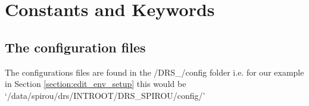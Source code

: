 \chapter{Constants and Keywords}

\newcommand{\calloc}{cal\_loc\_RAW\_spirou.py}
\newcommand{\caldark}{cal\_DARK\_spirou.py}
\newcommand{\calslit}{cal\_SLIT\_spirou.py}
\newcommand{\calff}{cal\_ff\_RAW\_spirou.py}
\newcommand{\calext}{cal\_extract\_RAW\_spirou\definevariable{fiber}.py}
\newcommand{\calextall}{cal\_extract\_RAW\_spirouALL.py}
\newcommand{\caldrift}{cal\_DRIFT\_RAW\_spirou.py}

\newcommand{\spirouRV}{spirouRV.py}
\newcommand{\hadmricdp}{hadmrICDP\_SPIROU.py}
\newcommand{\kwdrs}{KW\_DRS.py}
\newcommand{\rootdrsloc}{\definevariable{kw\_root\_drs\_loc}}
\newcommand{\rootdrsflat}{\definevariable{kw\_root\_drs\_flat}}
\newcommand{\locofiber}{*\_LOCO\_\definevariable{fiber}*}
\newcommand{\fwhmfiber}{*\_fwhm-order\_\definevariable{fiber}*}


\section{The configuration files}
\label{section:the_config_files}

The configurations files are found in the /DRS\_/config folder i.e. for our example in Section \ref{section:edit_env_setup} this would be `/data/spirou/drs/INTROOT/DRS\_SPIROU/config/'

